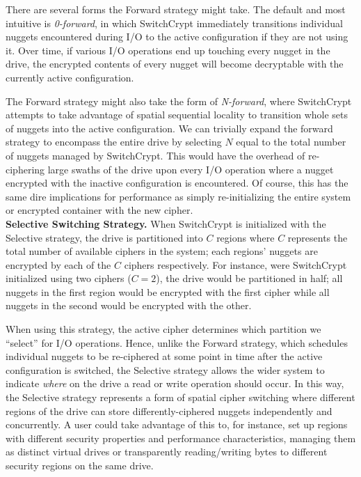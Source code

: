 There are several forms the Forward strategy might take. The default and
most intuitive is \emph{0-forward}, in which SwitchCrypt immediately transitions
individual nuggets encountered during I/O to the active configuration if they
are not using it. Over time, if various I/O operations end up touching every
nugget in the drive, the encrypted contents of every nugget will become
decryptable with the currently active configuration.

The Forward strategy might also take the form of \emph{N-forward}, where
SwitchCrypt attempts to take advantage of spatial sequential locality to
transition whole sets of nuggets into the active configuration. We can trivially
expand the forward strategy to encompass the entire drive by selecting $N$ equal
to the total number of nuggets managed by SwitchCrypt. This would have the
overhead of re-ciphering large swaths of the drive upon every I/O operation
where a nugget encrypted with the inactive configuration is encountered. Of
course, this has the same dire implications for performance as simply
re-initializing the entire system or encrypted container with the new cipher. \\

\textbf{Selective Switching Strategy.} When SwitchCrypt is initialized with the
Selective strategy, the drive is partitioned into $C$ regions where $C$
represents the total number of available ciphers in the system; each regions'
nuggets are encrypted by each of the $C$ ciphers respectively. For instance,
were SwitchCrypt initialized using two ciphers ($C = 2$), the drive would be
partitioned in half; all nuggets in the first region would be encrypted with the
first cipher while all nuggets in the second would be encrypted with the other.


When using this strategy, the active cipher determines which partition we
``select'' for I/O operations. Hence, unlike the Forward strategy, which
schedules individual nuggets to be re-ciphered at some point in time after the
active configuration is switched, the Selective strategy allows the wider system
to indicate \emph{where} on the drive a read or write operation should occur. In
this way, the Selective strategy represents a form of spatial cipher switching
where different regions of the drive can store differently-ciphered nuggets
independently and concurrently. A user could take advantage of this to, for
instance, set up regions with different security properties and performance
characteristics, managing them as distinct virtual drives or transparently
reading/writing bytes to different security regions on the same drive. \\

